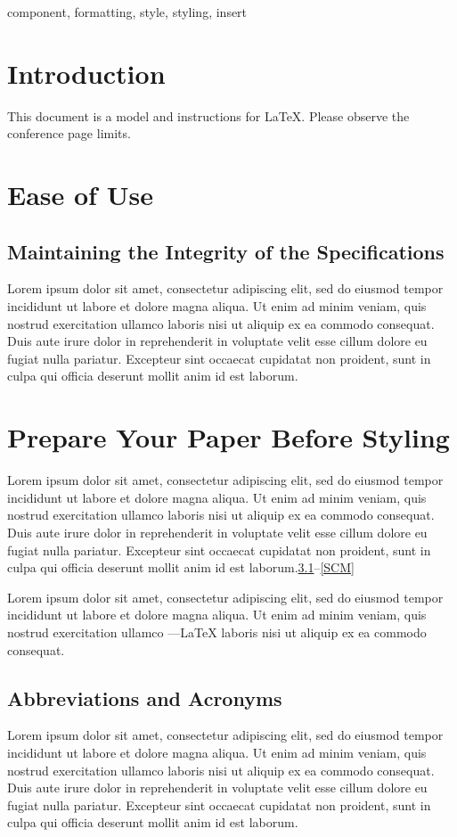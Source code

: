 \documentclass[conference]{IEEEtran}
\begin{document}
\begin{IEEEkeywords}
    component, formatting, style, styling, insert
\end{IEEEkeywords}

\section{Introduction}
    This document is a model and instructions for \LaTeX.
    Please observe the conference page limits. 
\section{Ease of Use}

\subsection{Maintaining the Integrity of the Specifications}
    Lorem ipsum dolor sit amet, consectetur adipiscing elit, sed do eiusmod 
    tempor incididunt ut labore et dolore magna aliqua. Ut enim ad minim 
    veniam, quis nostrud exercitation ullamco laboris nisi ut aliquip ex ea 
    commodo consequat. Duis aute irure dolor in reprehenderit in voluptate 
    velit esse cillum dolore eu fugiat nulla pariatur. Excepteur sint occaecat 
    cupidatat non proident, sunt in culpa qui officia deserunt mollit anim id 
    est laborum.
\section{Prepare Your Paper Before Styling}
    Lorem ipsum dolor sit amet, consectetur adipiscing elit, sed do eiusmod 
    tempor incididunt ut labore et dolore magna aliqua. Ut enim ad minim 
    veniam, quis nostrud exercitation ullamco laboris nisi ut aliquip ex ea 
    commodo consequat. Duis aute irure dolor in reprehenderit in voluptate 
    velit esse cillum dolore eu fugiat nulla pariatur. Excepteur sint occaecat 
    cupidatat non proident, sunt in culpa qui officia deserunt mollit anim id 
    est laborum.\ref{AA}--\ref{SCM} 

    Lorem ipsum dolor sit amet, consectetur adipiscing elit, sed do eiusmod 
    tempor incididunt ut labore et dolore magna aliqua. Ut enim ad minim 
    veniam, quis nostrud exercitation ullamco ---{\LaTeX} laboris nisi ut 
    aliquip ex ea commodo consequat.

\subsection{Abbreviations and Acronyms}\label{AA}
    Lorem ipsum dolor sit amet, consectetur adipiscing elit, sed do eiusmod 
    tempor incididunt ut labore et dolore magna aliqua. Ut enim ad minim 
    veniam, quis nostrud exercitation ullamco laboris nisi ut aliquip ex ea 
    commodo consequat. Duis aute irure dolor in reprehenderit in voluptate 
    velit esse cillum dolore eu fugiat nulla pariatur. Excepteur sint occaecat 
    cupidatat non proident, sunt in culpa qui officia deserunt mollit anim id 
    est laborum.
\end{document}

